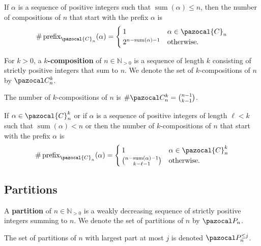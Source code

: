 \begin{proposition}
  If $\alpha$ is a sequence of positive integers such that
  $\operatorname{sum}(\alpha) \leq n$, then
  the number of compositions of $n$ that start with the prefix $\alpha$
  is \begin{equation}
    \#\operatorname{prefix}_{\pazocal{C}_n}(\alpha) = \begin{cases}
      1 & \alpha \in \pazocal{C}_n \\
      2^{n - \operatorname{sum}(\alpha) - 1} & \text{otherwise}.
    \end{cases}
  \end{equation}
\end{proposition}

\begin{definition}
  For $k > 0$, a $k$\textbf{-composition} of $n \in \mathbb{N}_{>0}$
  is a sequence of length $k$ consisting of strictly positive integers that sum
  to $n$. We denote the set of $k$-compositions of $n$ by $\pazocal C_n^{k}$.
\end{definition}

\begin{lemma}
  The number of $k$-compositions of $n$ is $\#\pazocal C_n^{k} = \binom{n-1}{k-1}$.
\end{lemma}

\begin{proposition}
  If $\alpha \in \pazocal{C}_n^{k}$ or if $\alpha$ is
  a sequence of positive integers of length $\ell < k$ such that
  ${\operatorname{sum}(\alpha) < n}$ or
  then the number of $k$-compositions of $n$ that start with the prefix $\alpha$
  is \begin{equation}
    \#\operatorname{prefix}_{\pazocal{C}_n}(\alpha) = \begin{cases}
      1 & \alpha \in \pazocal{C}_n^{k} \\
      \binom{n - \operatorname{sum}(\alpha) - 1}{k - \ell - 1} & \text{otherwise}.
    \end{cases}
  \end{equation}
\end{proposition}

\subsection{Partitions}
\begin{definition}
  A \textbf{partition} of $n \in \mathbb{N}_{>0}$ is a weakly decreasing
  sequence of strictly positive integers summing to $n$. We denote the set of
  partitions of $n$ by $\pazocal P_n$.

  The set of partitions of $n$ with largest part at most
  $j$ is denoted $\pazocal P_n^{\leq j}$.
\end{definition}

